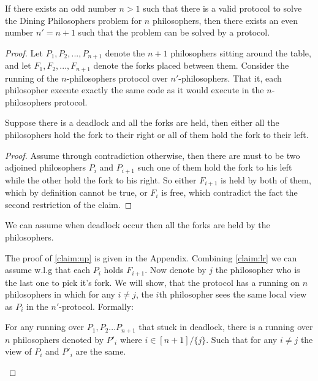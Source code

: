 \documentclass[manuscript,screen,review]{acmart}
\begin{document}
\begin{lemma} If there exists an odd number $n > 1$ such that there is a valid protocol to solve the Dining Philosophers problem for $n$ philosophers, then there exists an even number $n' = n+1$ such that the problem can be solved by a protocol.
\end{lemma}
\begin{proof}
  Let $P_1, P_2, ..., P_{n+1}$ denote the $n+1$ philosophers sitting around the table, and let $F_1, F_2, ..., F_{n+1}$ denote the forks placed between them. Consider the running of the $n$-philosophers protocol over $n'$-philosophers. That it, each philosopher execute exactly the same code as it would execute in the $n$-philosophers protocol. 

  \begin{claim} \label{claim:lr} 
Suppose there is a deadlock and all the forks are held, then either all the philosophers hold the fork to their right or all of them hold the fork to their left.
  \end{claim} 
  \begin{proof}
    Assume through contradiction otherwise, then there are must to be two adjoined philosophers $P_{i}$ and $P_{i+1}$ such one of them hold the fork to his left while the other hold the fork to his right. So either $F_{i+1}$ is held by both of them, which by definition cannot be true, or $F_{i}$ is free, which contradict the fact the second restriction of the claim. 
  \end{proof}
  \begin{claim} \label{claim:up} 
    We can assume when deadlock occur then all the forks are held by the philosophers. 
  \end{claim} 
  The proof of \cref{claim:up} is given in the Appendix. Combining \cref{claim:lr} we can assume w.l.g that each $P_{i}$ holds $F_{i+1}$. Now denote by $j$ the philosopher who is the last one to pick it's fork. We will show, that the protocol has a running on $n$ philosophers in which for any $i\neq j$, the $i$th philosopher sees the same local view as $P_{i}$ in the $n'$-protocol. Formally: 

  \begin{claim}
    For any running over $P_1, P_2 ... P_{n+1}$ that stuck in deadlock, there is a running over $n$ philosophers denoted by $P'_{i}$ where $i \in [n+1]/\{j\}$. Such that for any $i\neq j$ the view of $P_{i}$ and $P'_{i}$ are the same.     
  \end{claim}
 

\end{proof}
\end{document}
